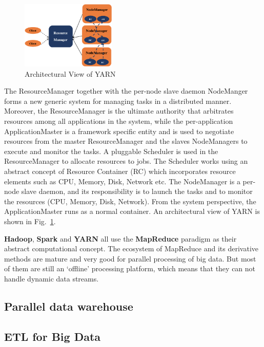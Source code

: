 \documentclass[	DIV=calc,%
							paper=a4,%
							fontsize=11pt,%
							twocolumn]{scrartcl}	 					%
\begin{document}
\begin{figure}
  \centering
    \includegraphics[width=0.4\textwidth]{images/YARN.png}
    \caption{Architectural View of YARN}
    \label{fig:YARN}   
\end{figure}

The ResourceManager together with the per-node slave daemon NodeManger forms a new generic system for managing tasks in a distributed manner. Moreover, the ResourceManager is the ultimate authority that arbitrates resources among all applications in the system, while the per-application ApplicationMaster is a framework specific entity and is used to negotiate resources from the master ResourceManager and the slaves NodeManagers to execute and monitor the tasks. A pluggable Scheduler is used in the ResourceManager to allocate resources to jobs. The Scheduler works using an abstract concept of Resource Container (RC) which incorporates resource elements such as CPU, Memory, Disk, Network etc. The NodeManager is a per-node slave daemon, and its responsibility is to launch the tasks and to monitor the resources (CPU, Memory, Disk, Network). From the system perspective, the ApplicationMaster runs as a normal container.
An architectural view of YARN is shown in Fig.~\ref{fig:YARN}.

\textbf{Hadoop}, \textbf{Spark} and \textbf{YARN} all use the \textbf{MapReduce} paradigm as their abstract computational concept. The ecosystem of MapReduce and its derivative methods are mature and very good for parallel processing of big data. But most of them are still an `offline' processing platform, which means that they can not handle dynamic data streams.



\subsection*{Parallel data warehouse}

\subsection*{ETL for Big Data}
\end{document}
